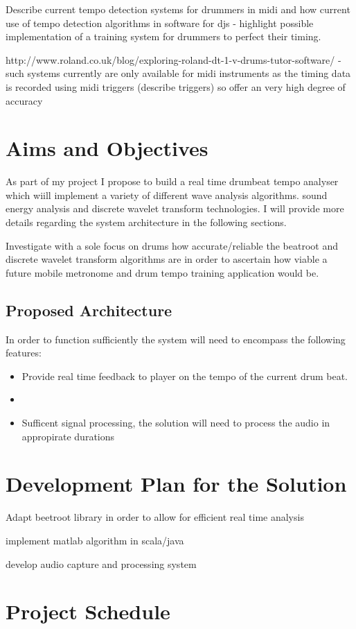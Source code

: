 \documentclass[a4paper, 11pt]{article}
\begin{document}
Describe current tempo detection systems for drummers in midi and how current use of tempo detection algorithms in software for djs - highlight possible implementation of a training system for drummers to perfect their timing.

http://www.roland.co.uk/blog/exploring-roland-dt-1-v-drums-tutor-software/ - such systems currently are only available for midi instruments as the timing data is recorded using midi triggers (describe triggers) so offer an very high degree of accuracy

\subsection{}

\maketitle{} \section{Aims and Objectives}
As part of my project I propose to build a real time drumbeat tempo analyser which wiill implement a variety of different wave analysis algorithms. sound energy analysis and discrete wavelet transform technologies. I will provide more details regarding the system architecture in the following sections. 

Investigate with a sole focus on drums how accurate/reliable the beatroot and discrete wavelet transform algorithms are in order to ascertain how viable a future mobile metronome and drum tempo training application would be.



\subsection{Proposed Architecture}
In order to function sufficiently the system will need to encompass the following features:

\begin{itemize}
\item Provide real time feedback to player on the tempo of the current drum beat.
\item 
\item Sufficent signal processing, the solution will need to process the audio in appropirate durations 
\end{itemize}



\maketitle{} 
\section{Development Plan for the Solution}

Adapt beetroot library in order to allow for efficient real time analysis

implement matlab algorithm in scala/java

develop audio capture and processing system 

\maketitle{} 
\section{Project Schedule}
\end{document}
